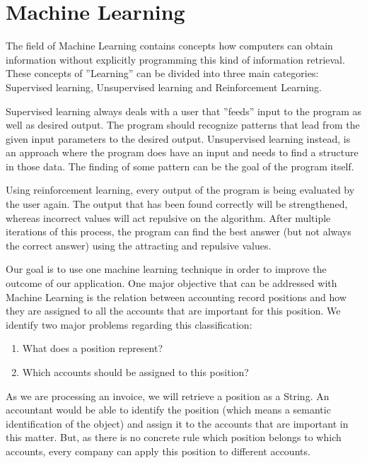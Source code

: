 %
% 
\chapter{Machine Learning}
\label{cha4}

The field of Machine Learning contains concepts how computers can obtain information without explicitly programming this kind of information retrieval. These concepts of ''Learning'' can be divided into three main categories: Supervised learning, Unsupervised learning and Reinforcement Learning.

Supervised learning always deals with a user that ''feeds'' input to the program as well as desired output. The program should recognize patterns that lead from the given input parameters to the desired output.
Unsupervised learning instead, is an approach where the program does have an input and needs to find a structure in those data. The finding of some pattern can be the goal of the program itself.

Using reinforcement learning, every output of the program is being evaluated by the user again. The output that has been found correctly will be strengthened, whereas incorrect values will act repulsive on the algorithm. After multiple iterations of this process, the program can find the best answer (but not always the correct answer) using the attracting and repulsive values.

Our goal is to use one machine learning technique in order to improve the outcome of our application. One major objective that can be addressed with Machine Learning is the relation between accounting record positions and how they are assigned to all the accounts that are important for this position.
We identify two major problems regarding this classification:
\begin{enumerate}
         \item What does a position represent?
         \item Which accounts should be assigned to this position?
\end{enumerate}
As we are processing an invoice, we will retrieve a position as a String. An accountant would be able to identify the position (which means a semantic identification of the object) and assign it to the accounts that are important in this matter. But, as there is no concrete rule which position belongs to which accounts, every company can apply this position to different accounts.

